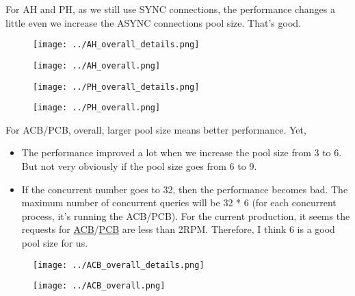 \documentclass{beamer}
\begin{document}
\begin{frame}
For AH and PH, as we still use SYNC connections, the performance changes a little even we increase the ASYNC connections pool size. That's good.
\begin{figure}    
\begin{minipage}[t]{0.48\textwidth}
\texttt{[image: ../AH\_overall\_details.png]}
\label{fig:immediate}
\end{minipage}
\hspace{\fill}
\begin{minipage}[t]{0.48\textwidth}
\texttt{[image: ../AH\_overall.png]}
\label{fig:proximal}
\end{minipage}
\end{figure}
\end{frame}

\begin{frame}
\begin{figure}    
\begin{minipage}[t]{0.48\textwidth}
\texttt{[image: ../PH\_overall\_details.png]}
\label{fig:immediate}
\end{minipage}
\hspace{\fill}
\begin{minipage}[t]{0.48\textwidth}
\texttt{[image: ../PH\_overall.png]}
\label{fig:proximal}
\end{minipage}
\end{figure}
\end{frame}

\begin{frame}
For ACB/PCB, overall, larger pool size means better performance. Yet,
\begin{itemize}
\item The performance improved a lot when we increase the pool size from 3 to 6. But not very obviously if the pool size goes from 6 to 9. 
\item If the concurrent number goes to 32, then the performance becomes bad. The maximum number of concurrent queries will be 32 * 6 (for each concurrent process, it's running the ACB/PCB). For the current production, it seems the requests for \href{https://rpm.newrelic.com/accounts/318144/key_transactions/7848}{ACB}/\href{https://rpm.newrelic.com/accounts/318144/key_transactions/7252}{PCB} are less than 2RPM. Therefore, I think 6 is a good pool size for us.
\end{itemize}
\begin{figure}    
\begin{minipage}[t]{0.48\textwidth}
\texttt{[image: ../ACB\_overall\_details.png]}
\label{fig:immediate}
\end{minipage}
\hspace{\fill}
\begin{minipage}[t]{0.48\textwidth}
\texttt{[image: ../ACB\_overall.png]}
\label{fig:proximal}
\end{minipage}
\end{figure}
\end{frame}
\end{document}

